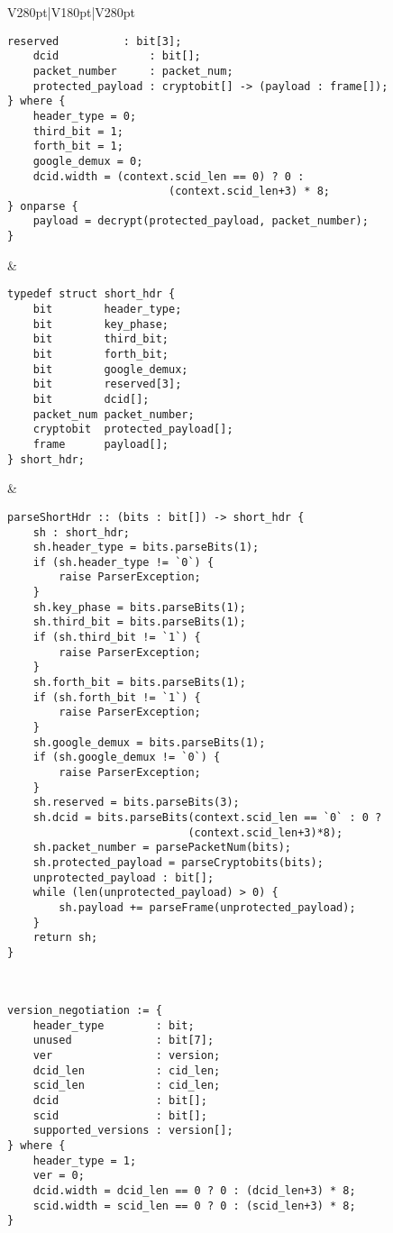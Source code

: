 \documentclass[10pt,a4paper,landscape]{article}
\begin{document}
\begin{longtable}{V{280pt}|V{180pt}|V{280pt}}
\begin{Verbatim}[fontsize=\small]
    reserved          : bit[3];
    dcid              : bit[];
    packet_number     : packet_num;
    protected_payload : cryptobit[] -> (payload : frame[]);
} where {
    header_type = 0;
    third_bit = 1;
    forth_bit = 1;
    google_demux = 0;
    dcid.width = (context.scid_len == 0) ? 0 : 
                         (context.scid_len+3) * 8;
} onparse {
    payload = decrypt(protected_payload, packet_number);
}
		\end{Verbatim}
		& 
		\begin{Verbatim}[fontsize=\small]
typedef struct short_hdr {
    bit        header_type;
    bit        key_phase;
    bit        third_bit;
    bit        forth_bit;
    bit        google_demux;
    bit        reserved[3];
    bit        dcid[];
    packet_num packet_number;
    cryptobit  protected_payload[];
    frame      payload[];
} short_hdr;
		\end{Verbatim}
		 &
		\begin{Verbatim}[fontsize=\small]
parseShortHdr :: (bits : bit[]) -> short_hdr {
    sh : short_hdr;
    sh.header_type = bits.parseBits(1);
    if (sh.header_type != `0`) {
        raise ParserException;
    }
    sh.key_phase = bits.parseBits(1);
    sh.third_bit = bits.parseBits(1);
    if (sh.third_bit != `1`) {
        raise ParserException;
    }
    sh.forth_bit = bits.parseBits(1);
    if (sh.forth_bit != `1`) {
        raise ParserException;
    }
    sh.google_demux = bits.parseBits(1);
    if (sh.google_demux != `0`) {
        raise ParserException;
    }
    sh.reserved = bits.parseBits(3);
    sh.dcid = bits.parseBits(context.scid_len == `0` : 0 ?
                            (context.scid_len+3)*8);
    sh.packet_number = parsePacketNum(bits);
    sh.protected_payload = parseCryptobits(bits);
    unprotected_payload : bit[];
    while (len(unprotected_payload) > 0) {
        sh.payload += parseFrame(unprotected_payload);
    }
    return sh;
}
		\end{Verbatim}
	\\ \hline
		\begin{Verbatim}[fontsize=\small]
version_negotiation := {
    header_type        : bit;
    unused             : bit[7];
    ver                : version;
    dcid_len           : cid_len;
    scid_len           : cid_len;
    dcid               : bit[];
    scid               : bit[];
    supported_versions : version[];
} where {
    header_type = 1;
    ver = 0;
    dcid.width = dcid_len == 0 ? 0 : (dcid_len+3) * 8;
    scid.width = scid_len == 0 ? 0 : (scid_len+3) * 8;
}
		\end{Verbatim}

\end{longtable}
\end{document}

